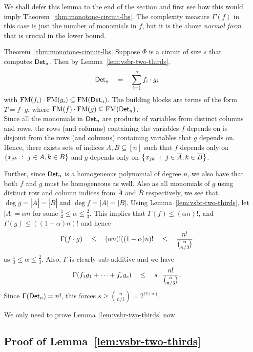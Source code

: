 We shall defer this lemma to the end of the section and first see how
this would imply Theorem~\ref{thm:monotone-circuit-lbs}. The complexity measure $\Gamma(f)$ in this case is just the number of monomials in $f$, but it is the above \emph{normal form} that is crucial in the lower bound. 

\begin{proofof}{Theorem~\ref{thm:monotone-circuit-lbs}}
Suppose $\Phi$ is a circuit of size $s$ that computes $\mathsf{Det}_n$. Then by Lemma~\ref{lem:vsbr-two-thirds}, 
$$
\mathsf{Det}_n \quad=\quad \sum_{i=1}^s f_i \cdot g_i
$$
with $\mathrm{FM}(f_i)\cdot \mathrm{FM}(g_i) \subseteq \mathrm{FM}(\mathsf{Det}_n)$. The building blocks are terms of the form $T = f\cdot g$, where $\mathrm{FM}(f)  \cdot \mathrm{FM}(g) \subseteq \mathrm{FM}(\mathsf{Det}_n)$. \\

Since all the monomials in $\mathsf{Det}_n$ are products of variables from
distinct columns and rows, the rows (and columns) containing the
variables $f$ depends on is disjoint from the rows (and columns)
containing variables that $g$ depends on. Hence, there exists sets of indices $A,B
\subseteq [n]$ such that $f$ depends only on $\left\{{x_{jk}}\ : \ {j\in
  A, k\in B}\right\}$ and $g$ depends only on
$\left\{{x_{jk}}\ : \ {j\in\overline{A}, k\in
  \overline{B}}\right\}$.

Further, since $\mathsf{Det}_n$ is a homogeneous polynomial of degree $n$, we also have that both $f$ and $g$ must be homogeneous as well. Also as all monomials of $g$ using distinct row and column indices from $\overline{A}$ and $\overline{B}$ respectively, we see that $\deg g = |\overline{A}| = |\overline{B}|$ and $\deg f = |A| = |B|$. Using Lemma~\ref{lem:vsbr-two-thirds}, let $|A| = \alpha n$ for some $\frac{1}{3}\leq \alpha \leq \frac{2}{3}$. This implies that $\Gamma(f)\leq (\alpha n)!$, and $\Gamma(g)\leq ((1-\alpha)n)!$ and hence
$$\Gamma(f\cdot g) \quad \leq\quad (\alpha n)! ((1-\alpha)n)! \quad\leq\quad \frac{n!}{\binom{n}{n/3}} $$
as $\frac{1}{3}\leq \alpha \leq \frac{2}{3}$.
Also, $\Gamma$ is clearly sub-additive and we have $$\Gamma(f_1g_1 + \dots + f_s g_s) \quad\leq\quad s \cdot \frac{n!}{\binom{n}{n/3}}.$$
Since $\Gamma(\mathsf{Det}_n) = n!$, this forces $s \geq
\binom{n}{n/3} = 2^{\Omega(n)}$.
\end{proofof}

We only need to prove Lemma~\ref{lem:vsbr-two-thirds} now.

\subsection{Proof of Lemma~\ref{lem:vsbr-two-thirds}}

